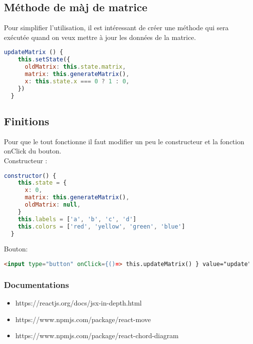 \documentclass[a4paper, french, 12pt]{extarticle}
\begin{document}
\subsection{Méthode de màj de matrice}
Pour simplifier l'utilisation, il est intéressant de créer une méthode qui sera exécutée quand on veux mettre à jour les données de la matrice.
\begin{lstlisting}[language=JavaScript]
  updateMatrix () {
    this.setState({
      oldMatrix: this.state.matrix,
      matrix: this.generateMatrix(),
      x: this.state.x === 0 ? 1 : 0,
    })
  }
\end{lstlisting}

\subsection{Finitions}
Pour que le tout fonctionne il faut modifier un peu le constructeur et la fonction onClick du bouton.\\
Constructeur : 
\begin{lstlisting}[language=JavaScript]
  constructor() {
    this.state = {
      x: 0,
      matrix: this.generateMatrix(),
      oldMatrix: null,
    }
    this.labels = ['a', 'b', 'c', 'd']
    this.colors = ['red', 'yellow', 'green', 'blue']
  }
\end{lstlisting}
Bouton:
\begin{lstlisting}[language=html]
  <input type="button" onClick={()=> this.updateMatrix() } value="update" />
\end{lstlisting}

\subsubsection{Documentations}
\begin{itemize}
  \item https://reactjs.org/docs/jsx-in-depth.html
  \item https://www.npmjs.com/package/react-move
  \item https://www.npmjs.com/package/react-chord-diagram
\end{itemize}
\end{document}
